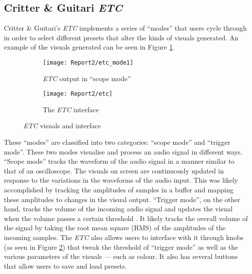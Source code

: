 \documentclass[../../initial_thesis.tex]{subfiles}
\begin{document}
\subsection{Critter \& Guitari \textit{ETC}}
Critter \& Guitari's \textit{ETC} implements a series of ``modes'' that users cycle through in order to select different presets that alter the kinds of visuals generated. An example of the visuals generated can be seen in Figure \ref{fig:etc_mode1}.

\begin{figure}
  \begin{subfigure}{0.5\textwidth}
    \centering
    \texttt{[image: Report2/etc\_mode1]}
    \caption{\textit{ETC} output in ``scope mode''}
    \label{fig:etc_mode1}
  \end{subfigure}
  \begin{subfigure}{0.5\textwidth}
    \centering
    \texttt{[image: Report2/etc]}
    \caption{The \textit{ETC} interface}
    \label{fig:etc_interface}
  \end{subfigure}
  \caption{\textit{ETC} visuals and interface}
  \label{fig:etc1}
\end{figure}

These ``modes'' are classified into two categories: ``scope mode'' and ``trigger mode''. These two modes visualise and process an audio signal in different ways. ``Scope mode'' tracks the waveform of the audio signal in a manner similar to that of an oscilloscope. The visuals on screen are continuously updated in response to the variations in the waveforms of the audio input. This was likely accomplished by tracking the amplitudes of samples in a buffer and mapping these amplitudes to changes in the visual output. ``Trigger mode'', on the other hand, tracks the volume of the incoming audio signal and updates the visual when the volume passes a certain threshold \cite{ETCmanual}. It likely tracks the overall volume of the signal by taking the root mean square (RMS) of the amplitudes of the incoming samples. The \textit{ETC} also allows users to interface with it through knobs (as seen in Figure \ref{fig:etc_interface}) that tweak the threshold of ``trigger mode'' as well as the various parameters of the visuals --- such as colour. It also has several buttons that allow users to save and load presets. \par
\end{document}
